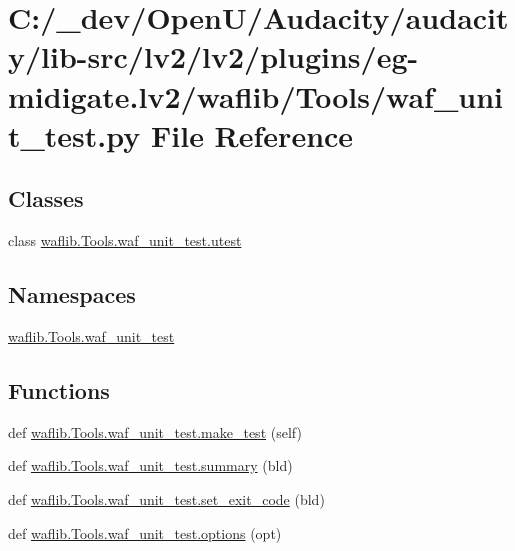 \hypertarget{lv2_2plugins_2eg-midigate_8lv2_2waflib_2_tools_2waf__unit__test_8py}{}\section{C\+:/\+\_\+dev/\+Open\+U/\+Audacity/audacity/lib-\/src/lv2/lv2/plugins/eg-\/midigate.lv2/waflib/\+Tools/waf\+\_\+unit\+\_\+test.py File Reference}
\label{lv2_2plugins_2eg-midigate_8lv2_2waflib_2_tools_2waf__unit__test_8py}
\subsection*{Classes}
\begin{DoxyCompactItemize}
\item 
class \hyperlink{classwaflib_1_1_tools_1_1waf__unit__test_1_1utest}{waflib.\+Tools.\+waf\+\_\+unit\+\_\+test.\+utest}
\end{DoxyCompactItemize}
\subsection*{Namespaces}
\begin{DoxyCompactItemize}
\item 
 \hyperlink{namespacewaflib_1_1_tools_1_1waf__unit__test}{waflib.\+Tools.\+waf\+\_\+unit\+\_\+test}
\end{DoxyCompactItemize}
\subsection*{Functions}
\begin{DoxyCompactItemize}
\item 
def \hyperlink{namespacewaflib_1_1_tools_1_1waf__unit__test_a480792e43cdb6d6a2bd79b2ec412cf00}{waflib.\+Tools.\+waf\+\_\+unit\+\_\+test.\+make\+\_\+test} (self)
\item 
def \hyperlink{namespacewaflib_1_1_tools_1_1waf__unit__test_ad245dac5d636a5c5f49cb0e232d332f4}{waflib.\+Tools.\+waf\+\_\+unit\+\_\+test.\+summary} (bld)
\item 
def \hyperlink{namespacewaflib_1_1_tools_1_1waf__unit__test_a0f1dc47e6fcefddfd017ce557eb4da42}{waflib.\+Tools.\+waf\+\_\+unit\+\_\+test.\+set\+\_\+exit\+\_\+code} (bld)
\item 
def \hyperlink{namespacewaflib_1_1_tools_1_1waf__unit__test_a8f30080b41250ee5ad33b2ad2df40f0c}{waflib.\+Tools.\+waf\+\_\+unit\+\_\+test.\+options} (opt)
\end{DoxyCompactItemize}

